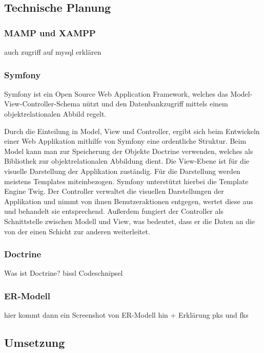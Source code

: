   \subsection{Technische Planung}

    \subsubsection{MAMP und XAMPP}

auch zugriff auf mysql erklären

    \subsubsection{Symfony}

Symfony ist ein Open Source Web Application Framework, welches das Model-View-Controller-Schema nützt und den Datenbankzugriff mittels einem objektrelationalen Abbild regelt.

Durch die Einteilung in Model, View und Controller, ergibt sich beim Entwickeln einer Web Applikation mithilfe von Symfony eine ordentliche Struktur.
Beim Model kann man zur Speicherung der Objekte Doctrine verwenden, welches als Bibliothek zur objektrelationalen Abbildung dient.
Die View-Ebene ist für die visuelle Darstellung der Applikation zuständig. Für die  Darstellung werden meistens Templates miteinbezogen. Symfony unterstützt hierbei die Template Engine Twig.
Der Controller verwaltet die visuellen Darstellungen der Applikation und nimmt von ihnen Benutzeraktionen entgegen, wertet diese aus und behandelt sie entsprechend. Außerdem fungiert der Controller als Schnittstelle zwischen Modell und View, was bedeutet, dass er die Daten an die von der einen Schicht zur anderen weiterleitet.


    \subsubsection{Doctrine}

Was ist Doctrine?
bissl Codeschnipsel

    \subsubsection{ER-Modell}

hier kommt dann ein Screenshot von ER-Modell hin + Erklärung pks und fks

  \subsection{Umsetzung}

